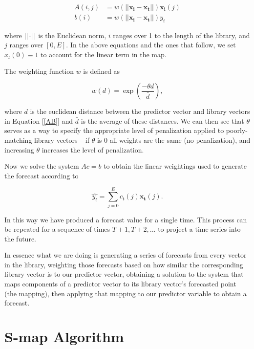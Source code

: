     \begin{equation}\label{AB}
    	\begin{array}{rl}
        \displaystyle
            A(i, j) & = w (||\mathbf{x_i}-\mathbf{x_t}||) \mathbf{x_i}(j) \\
            b(i) 	& = w (||\mathbf{x_i}-\mathbf{x_t}||) y_i
        \end{array}
    \end{equation}

    where $||\cdot||$ is the Euclidean norm, $i$ ranges over 1 to the length of the library, and $j$ ranges over $[0,E]$. In the above equations and the ones that follow, we set $x_t(0) \equiv 1$ to account for the linear term in the map.

	The weighting function $w$ is defined as

	\begin{equation}
		w(d) = \exp \left( \frac{-\theta d}{\bar{d}} \right) ,
	\end{equation}

	where $d$ is the euclidean distance between the predictor vector and library vectors in Equation [\ref{AB}] and $\bar{d}$ is the average of these distances. We can then see that $\theta$ serves as a way to specify the appropriate level of penalization applied to poorly-matching library vectors -- if $\theta$ is 0 all weights are the same (no penalization), and increasing $\theta$ increases the level of penalization.

	Now we solve the system $Ac = b$ to obtain the linear weightings used to generate the forecast according to

	\begin{equation}
		\hat{y_t} = \sum_{j = 0}^{E} c_t(j) \mathbf{x_t}(j) .
	\end{equation}

	In this way we have produced a forecast value for a single time. This process can be repeated for a sequence of times $T + 1, T + 2, ...$ to project a time series into the future.

	In essence what we are doing is generating a series of forecasts from every vector in the library, weighting those forecasts based on how similar the corresponding library vector is to our predictor vector, obtaining a solution to the system that maps components of a predictor vector to its library vector's forecasted point (the mapping), then applying that mapping to our predictor variable to obtain a forecast.


\section{S-map Algorithm}

